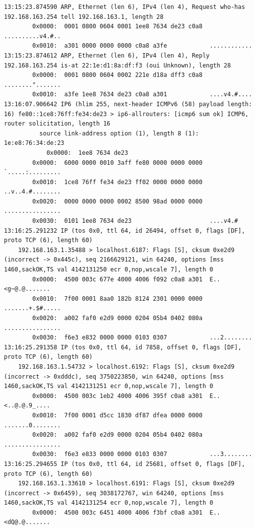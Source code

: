 \documentclass[11pt, a4paper]{article}
\begin{document}
\begin{Verbatim}[fontsize=\footnotesize]
13:15:23.874590 ARP, Ethernet (len 6), IPv4 (len 4), Request who-has 192.168.163.254 tell 192.168.163.1, length 28
        0x0000:  0001 0800 0604 0001 1ee8 7634 de23 c0a8  ..........v4.#..
        0x0010:  a301 0000 0000 0000 c0a8 a3fe            ............
13:15:23.874612 ARP, Ethernet (len 6), IPv4 (len 4), Reply 192.168.163.254 is-at 22:1e:d1:8a:df:f3 (oui Unknown), length 28
        0x0000:  0001 0800 0604 0002 221e d18a dff3 c0a8  ........".......
        0x0010:  a3fe 1ee8 7634 de23 c0a8 a301            ....v4.#....
13:16:07.906642 IP6 (hlim 255, next-header ICMPv6 (58) payload length: 16) fe80::1ce8:76ff:fe34:de23 > ip6-allrouters: [icmp6 sum ok] ICMP6, router solicitation, length 16
          source link-address option (1), length 8 (1): 1e:e8:76:34:de:23
            0x0000:  1ee8 7634 de23
        0x0000:  6000 0000 0010 3aff fe80 0000 0000 0000  `.....:.........
        0x0010:  1ce8 76ff fe34 de23 ff02 0000 0000 0000  ..v..4.#........
        0x0020:  0000 0000 0000 0002 8500 98ad 0000 0000  ................
        0x0030:  0101 1ee8 7634 de23                      ....v4.#
13:16:25.291232 IP (tos 0x0, ttl 64, id 26494, offset 0, flags [DF], proto TCP (6), length 60)
    192.168.163.1.35488 > localhost.6187: Flags [S], cksum 0xe2d9 (incorrect -> 0x445c), seq 2166629121, win 64240, options [mss 1460,sackOK,TS val 4142131250 ecr 0,nop,wscale 7], length 0
        0x0000:  4500 003c 677e 4000 4006 f092 c0a8 a301  E..<g~@.@.......
        0x0010:  7f00 0001 8aa0 182b 8124 2301 0000 0000  .......+.$#.....
        0x0020:  a002 faf0 e2d9 0000 0204 05b4 0402 080a  ................
        0x0030:  f6e3 e832 0000 0000 0103 0307            ...2........
13:16:25.291358 IP (tos 0x0, ttl 64, id 7858, offset 0, flags [DF], proto TCP (6), length 60)
    192.168.163.1.54732 > localhost.6192: Flags [S], cksum 0xe2d9 (incorrect -> 0xdddc), seq 3750223850, win 64240, options [mss 1460,sackOK,TS val 4142131251 ecr 0,nop,wscale 7], length 0
        0x0000:  4500 003c 1eb2 4000 4006 395f c0a8 a301  E..<..@.@.9_....
        0x0010:  7f00 0001 d5cc 1830 df87 dfea 0000 0000  .......0........
        0x0020:  a002 faf0 e2d9 0000 0204 05b4 0402 080a  ................
        0x0030:  f6e3 e833 0000 0000 0103 0307            ...3........
13:16:25.294655 IP (tos 0x0, ttl 64, id 25681, offset 0, flags [DF], proto TCP (6), length 60)
    192.168.163.1.33610 > localhost.6191: Flags [S], cksum 0xe2d9 (incorrect -> 0x6459), seq 3038172767, win 64240, options [mss 1460,sackOK,TS val 4142131254 ecr 0,nop,wscale 7], length 0
        0x0000:  4500 003c 6451 4000 4006 f3bf c0a8 a301  E..<dQ@.@.......

\end{Verbatim}
\end{document}

